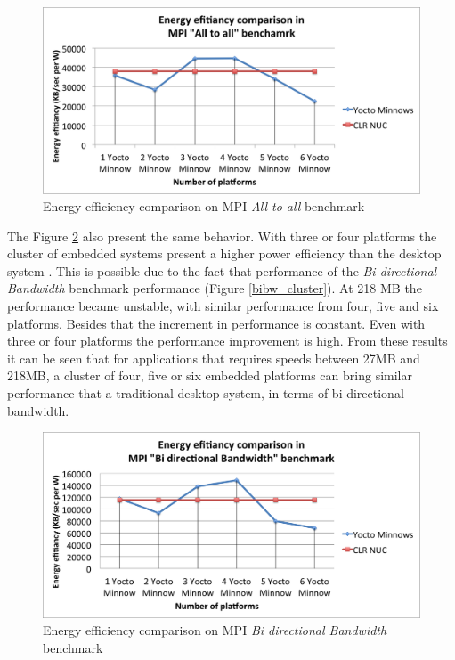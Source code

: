 \begin{figure}[H]
\centering
\includegraphics[width=1 \textwidth]{images/energy_results/all_to_all.png}
\caption{Energy efficiency comparison on MPI \textit{All to all} benchmark}
\label{alltoall_energy}
\end{figure}

The Figure \ref{bibw_energy} also present the same behavior. With three or four
platforms the cluster of embedded systems present a higher power efficiency
than the desktop system \cite{NUC}. This is possible due to the fact that
performance of the \textit{Bi directional Bandwidth} benchmark performance
(Figure \ref{bibw_cluster}). At 218 MB the performance became unstable, with
similar performance from four, five and six platforms. Besides that the
increment in performance is constant. Even with three or four platforms the
performance improvement is high. From these results it can be seen that for
applications that requires speeds between 27MB and 218MB, a cluster of four,
five or six embedded platforms can bring similar performance that a traditional
desktop system, in terms of bi directional bandwidth.

\begin{figure}[H]
\centering
\includegraphics[width=1 \textwidth]{images/energy_results/bibw.png}
\caption{Energy efficiency comparison on MPI \textit{Bi directional Bandwidth} benchmark}
\label{bibw_energy}
\end{figure}


